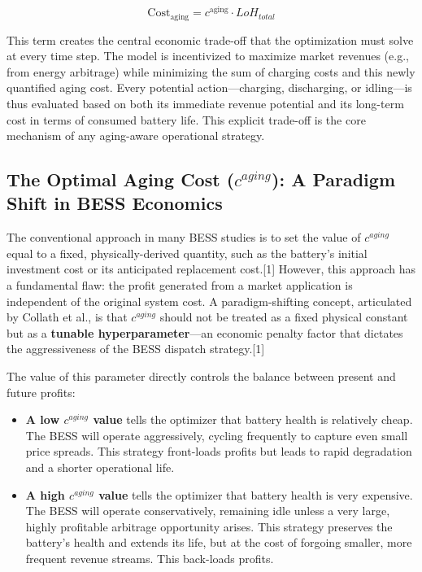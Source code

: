 \begin{equation}
\text{Cost}_{\text{aging}} = c^{\text{aging}} \cdot LoH_{total}
\end{equation}

This term creates the central economic trade-off that the optimization must solve at every time step. The model is incentivized to maximize market revenues (e.g., from energy arbitrage) while minimizing the sum of charging costs and this newly quantified aging cost. Every potential action—charging, discharging, or idling—is thus evaluated based on both its immediate revenue potential and its long-term cost in terms of consumed battery life. This explicit trade-off is the core mechanism of any aging-aware operational strategy.

\subsection{The Optimal Aging Cost ($c^{aging}$): A Paradigm Shift in BESS Economics}

The conventional approach in many BESS studies is to set the value of $c^{aging}$ equal to a fixed, physically-derived quantity, such as the battery's initial investment cost or its anticipated replacement cost.[1] However, this approach has a fundamental flaw: the profit generated from a market application is independent of the original system cost. A paradigm-shifting concept, articulated by Collath et al., is that $c^{aging}$ should not be treated as a fixed physical constant but as a \textbf{tunable hyperparameter}—an economic penalty factor that dictates the aggressiveness of the BESS dispatch strategy.[1]

The value of this parameter directly controls the balance between present and future profits:
\begin{itemize}
    \item \textbf{A low $c^{aging}$ value} tells the optimizer that battery health is relatively cheap. The BESS will operate aggressively, cycling frequently to capture even small price spreads. This strategy front-loads profits but leads to rapid degradation and a shorter operational life.
    \item \textbf{A high $c^{aging}$ value} tells the optimizer that battery health is very expensive. The BESS will operate conservatively, remaining idle unless a very large, highly profitable arbitrage opportunity arises. This strategy preserves the battery's health and extends its life, but at the cost of forgoing smaller, more frequent revenue streams. This back-loads profits.
\end{itemize}

